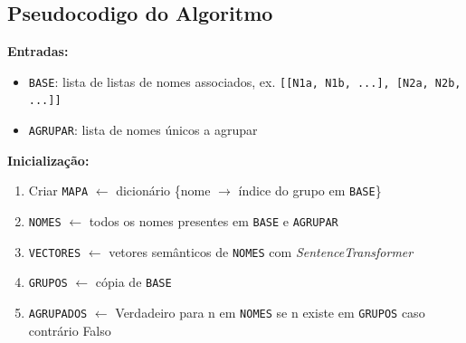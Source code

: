 \documentclass[a4paper,12pt]{article}
\begin{document}
\subsection*{Pseudocodigo do Algoritmo}

\noindent\textbf{Entradas:}
\begin{itemize}
    \item \texttt{BASE}: lista de listas de nomes associados, ex. \texttt{[[N1a, N1b, ...], [N2a, N2b, ...]]}
    \item \texttt{AGRUPAR}: lista de nomes únicos a agrupar
\end{itemize}

\vspace{0.5em}
\noindent\textbf{Inicialização:}
\begin{enumerate}
    \item Criar \texttt{MAPA} $\leftarrow$ dicionário \{nome $\rightarrow$ índice do grupo em \texttt{BASE}\}
    \item \texttt{NOMES} $\leftarrow$ todos os nomes presentes em \texttt{BASE} e \texttt{AGRUPAR}
    \item \texttt{VECTORES} $\leftarrow$ vetores semânticos de \texttt{NOMES} com \textit{SentenceTransformer}
    \item \texttt{GRUPOS} $\leftarrow$ cópia de \texttt{BASE}
    \item \texttt{AGRUPADOS} $\leftarrow$ Verdadeiro para n em \texttt{NOMES} se n existe em \texttt{GRUPOS} caso contrário Falso 
\end{enumerate}
\end{document}
